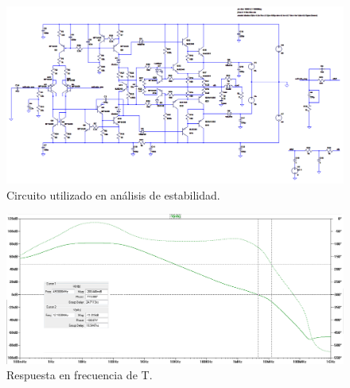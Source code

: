 \begin{figure}[H]
\centering
\includegraphics[width=1\textwidth]{img/margen_fase_ganancia_cir.png}
\caption{Circuito utilizado en análisis de estabilidad.}
\label{cir_simul_estab}
\end{figure}


\begin{figure}[H]
\centering
\includegraphics[width=1\textwidth]{img/margen_fase_ganancia.png}
\caption{Respuesta en frecuencia de T.}
\label{simul_estab}
\end{figure}



\medskip
